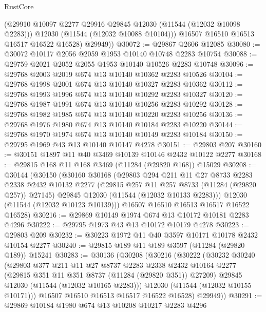 \begin{lexlean}{RustCore}
\begin{coremodule}
            (@29910 @10097 @2277 @29916 @29845 @12030 (@11544 (@12032 @10098 @2283)))
            @12030
            (@11544 (@12032 @10088 @10104)))
          @16507
          @16510
          @16513
          @16517
          @16522
          @16528)
        @29949))
@30072 := @29867 @2606 @12085
@30080 := @30072 @10117 @2056 @2059 @1953 @10140 @10748 @2283 @10754
@30088 := @29759 @2021 @2052 @2055 @1953 @10140 @10526 @2283 @10748
@30096 := @29768 @2003 @2019 @674 @13 @10140 @10362 @2283 @10526
@30104 := @29768 @1998 @2001 @674 @13 @10140 @10327 @2283 @10362
@30112 := @29768 @1993 @1996 @674 @13 @10140 @10292 @2283 @10327
@30120 := @29768 @1987 @1991 @674 @13 @10140 @10256 @2283 @10292
@30128 := @29768 @1982 @1985 @674 @13 @10140 @10220 @2283 @10256
@30136 := @29768 @1976 @1980 @674 @13 @10140 @10184 @2283 @10220
@30144 := @29768 @1970 @1974 @674 @13 @10140 @10149 @2283 @10184
@30150 := @29795 @1969 @43 @13 @10140 @10147 @4278
@30151 := @29803 @207
@30160 := @30151 @1897 @11 @40 @3469 @10139 @10146 @2432 @10122 @2277
@30168 := @29815 @168 @11 @168 @3469 (@11284 (@29820 @168)) @15029
@30208 := @30144
    (@30150
      (@30160
        @30168
        (@29803
          @294
          @211
          @11
          @27
          @8733
          @2283
          @2338
          @2432
          @10132
          @2277
          (@29815 @257 @11 @257 @8733 (@11284 (@29820 @257)) @27145)
          @29845
          @12030
          (@11544 (@12032 @10133 @2283)))
        @12030
        (@11544 (@12032 @10123 @10139)))
      @16507
      @16510
      @16513
      @16517
      @16522
      @16528)
@30216 := @29869 @10149 @1974 @674 @13 @10172 @10181 @2283 @4296
@30222 := @29795 @1973 @43 @13 @10172 @10179 @4278
@30223 := @29803 @209
@30232 := @30223 @1972 @11 @40 @3597 @10171 @10178 @2432 @10154 @2277
@30240 := @29815 @189 @11 @189 @3597 (@11284 (@29820 @189)) @15241
@30283 := @30136
    (@30208
      (@30216
        (@30222
          (@30232
            @30240
            (@29803
              @377
              @211
              @11
              @27
              @8737
              @2283
              @2338
              @2432
              @10164
              @2277
              (@29815 @351 @11 @351 @8737 (@11284 (@29820 @351)) @27209)
              @29845
              @12030
              (@11544 (@12032 @10165 @2283)))
            @12030
            (@11544 (@12032 @10155 @10171)))
          @16507
          @16510
          @16513
          @16517
          @16522
          @16528)
        @29949))
@30291 := @29869 @10184 @1980 @674 @13 @10208 @10217 @2283 @4296

\end{coremodule}
\end{lexlean}
